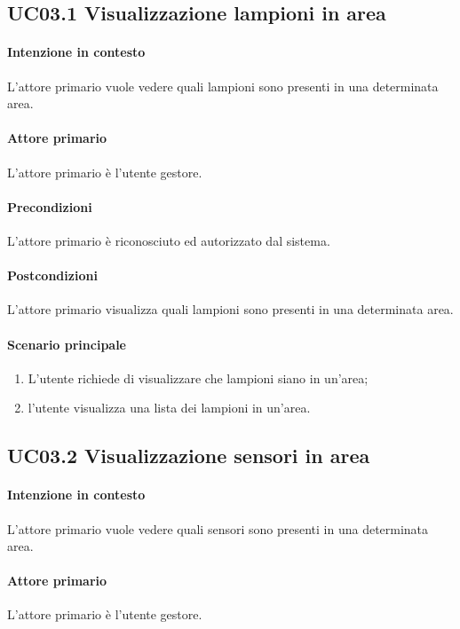 \subsection{UC03.1 Visualizzazione lampioni in area}
\paragraph{Intenzione in contesto} L'attore primario vuole vedere quali lampioni sono presenti in una determinata area.

\paragraph{Attore primario} L'attore primario è l'utente gestore.
\paragraph{Precondizioni} L'attore primario è riconosciuto ed autorizzato dal sistema.
\paragraph{Postcondizioni} L'attore primario visualizza quali lampioni sono presenti in una determinata area.

\paragraph{Scenario principale}
\begin{enumerate}
    \item L'utente richiede di visualizzare che lampioni siano in un'area;
    \item l'utente visualizza una lista dei lampioni in un'area.
\end{enumerate}

\subsection{UC03.2 Visualizzazione sensori in area}
\paragraph{Intenzione in contesto} L'attore primario vuole vedere quali sensori sono presenti in una determinata area.
\paragraph{Attore primario} L'attore primario è l'utente gestore.
